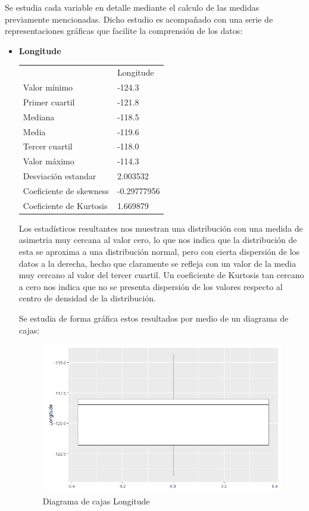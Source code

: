 Se estudia cada variable en detalle mediante el calculo de las medidas previamente mencionadas. Dicho estudio es acompañado con una serie de representaciones gráficas que facilite la comprensión de los datos:

\begin{itemize}
	\item \textbf{Longitude}
			\begin{table}[h!]
				\centering
				\begin{tabular}{ll}
					& Longitude   \\
					Valor mínimo            & -124.3      \\
					Primer cuartil          & -121.8      \\
					Mediana                 & -118.5      \\
					Media                   & -119.6      \\
					Tercer cuartil          & -118.0      \\
					Valor máximo            & -114.3      \\ \hline
					Desviación estandar     & 2.003532    \\ \hline
					Coeficiente de skewness & -0.29777956 \\
					Coeficiente de Kurtosis & 1.669879   
				\end{tabular}
			\end{table}

Los estadísticos resultantes nos muestran una distribución con una medida de asimetria muy cercana al valor cero, lo que nos indica que la distribución de esta se aproxima a una distribución normal, pero con cierta dispersión de los datos a la derecha, hecho que claramente se refleja con un valor de la media muy cercano al valor del tercer cuartil.
Un coeficiente de Kurtosis tan cercano a cero nos indica que no se presenta dispersión de los valores respecto al centro de densidad de la distribución.

Se estudia de forma gráfica estos resultados por medio de un diagrama de cajas:

\begin{figure}[h!]
	\centering
	\includegraphics[width=0.7\linewidth]{figures/eda_box_1}
	\caption{Diagrama de cajas Longitude}
	\label{fig:edabox1}
\end{figure}


\end{itemize}
